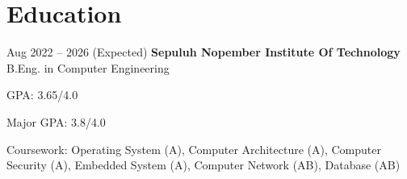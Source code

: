 \section{Education}

    \begin{twocolentry}{
        Aug 2022 – 2026 (Expected)
    }
    \textbf{Sepuluh Nopember Institute Of Technology}\\
    B.Eng. in Computer Engineering\end{twocolentry}

    \vspace{0.10 cm}
    \begin{onecolentry}
        \begin{highlights}
            \item GPA: 3.65/4.0
            \item Major GPA: 3.8/4.0
            \item Coursework:
                Operating System (A),
                Computer Architecture (A),
                Computer Security (A),
                Embedded System (A),
                Computer Network (AB),
                Database (AB)
        \end{highlights}
    \end{onecolentry}
